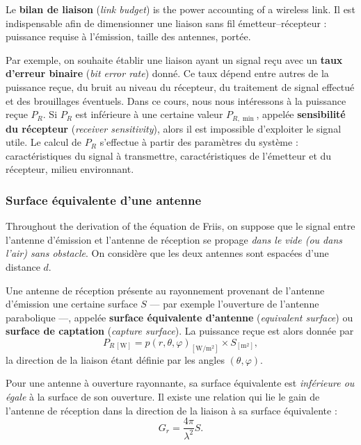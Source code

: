 \begin{definition}
  Le \textbf{bilan de liaison} (\textit{link budget}) is the power accounting
  of a wireless link. Il est indispensable afin de dimensionner une liaison sans
  fil émetteur--récepteur : puissance requise à l'émission, taille des
  antennes, portée.
\end{definition}

Par exemple, on souhaite établir une liaison ayant un signal reçu avec un
\textbf{taux d'erreur binaire} (\textit{bit error rate}) donné. Ce taux dépend
entre autres de la puissance reçue, du bruit au niveau du récepteur, du
traitement de signal effectué et des brouillages éventuels. Dans ce cours, nous
nous intéressons à la puissance reçue $P_R$. Si $P_R$ est inférieure à une
certaine valeur $P_{R,\min}$, appelée \textbf{sensibilité du récepteur}
(\textit{receiver sensitivity}), alors il est impossible d'exploiter le signal
utile. Le calcul de $P_R$ s'effectue à partir des paramètres du système :
caractéristiques du signal à transmettre, caractéristiques de l'émetteur et du
récepteur, milieu environnant.

\subsubsection{Surface équivalente d'une antenne}

Throughout the derivation of the équation de Friis, on suppose que le signal
entre l'antenne d'émission et l'antenne de réception se propage \emph{dans le
vide (ou dans l'air) sans obstacle}. On considère que les deux antennes sont
espacées d'une distance $d$.

\begin{definition}
  Une antenne de réception présente au rayonnement provenant de l'antenne
  d'émission une certaine surface $S$ --- par exemple l'ouverture de l'antenne
  parabolique ---, appelée \textbf{surface équivalente d'antenne}
  (\textit{equivalent surface}) ou \textbf{surface de captation}
  (\textit{capture surface}). La puissance reçue est alors donnée par
  \[ P_{R\,[\mathrm{W}]} = p(r,\theta,\varphi)_{[\mathrm{W/m^2}]} \times S_{[\mathrm{m^2}]}, \]
  la direction de la liaison étant définie par les angles $(\theta,\varphi)$.
\end{definition}

Pour une antenne à ouverture rayonnante, sa surface équivalente est
\emph{inférieure ou égale} à la surface de son ouverture. Il existe une
relation qui lie le gain de l'antenne de réception dans la direction de la
liaison à sa surface équivalente :
\[ G_r = \frac{4\pi}{\lambda^2} S. \]

